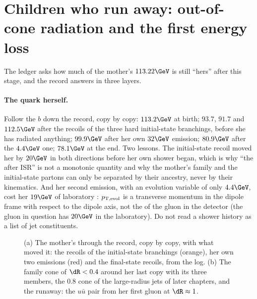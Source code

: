 \section{Children who run away: out-of-cone radiation and the first energy loss}
\label{sec:mother_gives_birth:runaways}

The ledger asks how much of the mother's $113.22\GeV$ is still ``hers''
after this stage, and the record answers in three layers.

\paragraph{The quark herself.} Follow the $b$ down the record, copy by copy:
$113.2\GeV$ at birth; $93.7$, $91.7$ and $112.5\GeV$ after the recoils of
the three hard initial-state branchings, before she has radiated anything;
$99.9\GeV$ after her own $32\GeV$ emission; $80.9\GeV$ after the $4.4\GeV$
one; $78.1\GeV$ at the end. Two lessons. The initial-state recoil moved her
by $20\GeV$ in both directions before her own shower began, which is why
``the \pt after ISR'' is not a monotonic quantity and why the mother's
family and the initial-state partons can only be separated by their
ancestry, never by their kinematics. And her second emission, with an
evolution variable of only $4.4\GeV$, cost her $19\GeV$ of laboratory \pt:
$p_{\mathrm{T,evol}}$ is a transverse momentum in the dipole frame with
respect to the dipole axis, not the \pt of the gluon in the detector (the
gluon in question has $20\GeV$ in the laboratory). Do not read a shower
history as a list of jet constituents.

\begin{figure}[htbp]\centering
\resizebox{\textwidth}{!}{}
\caption[The mother's $\pt$ copy by copy, and the family cone around her last copy]{(a) The mother's \pt through the record, copy by copy, with what moved it: the recoils of the initial-state branchings (orange), her own two emissions (red) and the final-state recoils, from the  log. (b) The family cone of $\dR<0.4$ around her last copy with its three members, the $0.8$ cone of the large-radius jets of later chapters, and the runaway: the $u\bar u$ pair from her first gluon at $\dR\approx1$.}
\label{fig:mother_gives_birth:recoil_chain}
\end{figure}

